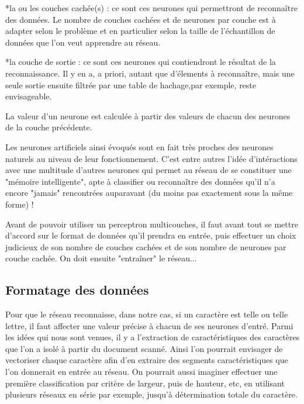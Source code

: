 \documentclass[a4paper,10pt]{report}
\begin{document}
*la ou les couches cach\'ee(s) : ce sont ces neurones qui permettront de
reconna\^itre des donn\'ees. Le nombre de couches cach\'ees et de
neurones par couche est \`a adapter selon le probl\`eme et en
particulier selon la taille de l'\'echantillon de donn\'ees que l'on veut
apprendre au r\'eseau.

*la couche de sortie : ce sont ces neurones qui contiendront le
r\'esultat de la reconnaissance. Il y en a, a priori, autant que
d'\'elements \`a reconna\^itre, mais une seule sortie ensuite filtr\'ee
par une table de hachage,par exemple, reste envisageable.


La valeur d'un neurone est calcul\'ee \`a partir des valeurs de chacun
des neurones de la couche pr\'ec\'edente.

Les neurones artificiels ainsi \'evoqu\'es sont en fait tr\`es proches
des neurones naturels au niveau de leur fonctionnement. C'est entre
autres l'id\'ee d'int\'eractions avec une multitude d'autres neurones
qui permet au r\'eseau de se constituer une "m\'emoire intelligente",
apte \`a classifier ou reconnaĩtre des donn\'ees qu'il n'a encore
"jamais" rencontr\'ees auparavant (du moins pas exactement sous la
même forme) !

Avant de pouvoir utiliser un perceptron multicouches, il faut avant tout se mettre d'accord sur le
format de donn\'ees qu'il prendra en entr\'ee, puis effectuer un choix
judicieux de son nombre de couches cach\'ees et de son nombre de neurones
par couche cach\'ee. On doit ensuite "entra\^iner" le r\'eseau...


\subsection{Formatage des donn\'ees} %
\label{subsec:formatage_des_donnees}

Pour que le r\'eseau reconnaisse, dans notre cas, si un caract\`ere est
telle ou telle lettre, il faut affecter une valeur pr\'ecise à chacun de
ses neurones d'entr\'e.
Parmi les id\'ees qui nous sont venues, il y a l'extraction de
caract\'eristiques des caract\`eres que l'on a isol\'e \`a partir du document
scann\'e. Ainsi l'on pourrait envisager de vectoriser chaque caract\`ere
afin d'en extraire des segments caract\'eristiques que l'on donnerait en
entr\'ee au r\'eseau. On pourrait aussi imaginer effectuer une premi\`ere
classification par crit\`ere de largeur, puis de hauteur, etc, en utilisant
plusieurs r\'eseaux en s\'erie par exemple, jusqu'\`a d\'etermination totale du
caract\`ere.
\end{document}

